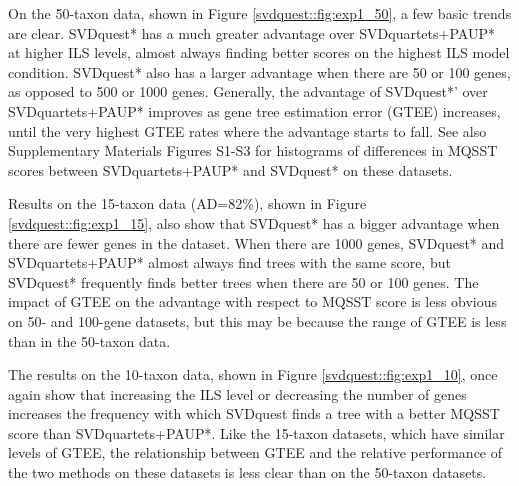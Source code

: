 On the 50-taxon data, shown in Figure \ref{svdquest::fig:exp1_50}, a few basic
trends are clear. 
SVDquest* has a much greater advantage over SVDquartets+PAUP* at
higher ILS levels, almost always finding better scores on the highest
ILS model condition. SVDquest* also has a larger advantage when there
are 50 or 100 genes, as opposed to 500 or 1000 genes. 
Generally, the advantage of 
SVDquest*' over SVDquartets+PAUP* improves as gene tree estimation error (GTEE)
increases, until the very highest GTEE rates where
the advantage starts to fall. 
See also {Supplementary Materials Figures S1-S3} for  histograms of differences in MQSST scores between SVDquartets+PAUP* and SVDquest* on these datasets.

Results on the 15-taxon data (AD=82\%), shown in Figure \ref{svdquest::fig:exp1_15}, also show
that SVDquest* has a bigger advantage when there are fewer genes in
the dataset. When there are 1000 genes, SVDquest* and SVDquartets+PAUP* almost
always find trees with the same score, but SVDquest* frequently finds
better trees when there are 50 or 100 genes. 
The impact of GTEE on the advantage with respect to MQSST score is less obvious on 50- and 100-gene datasets, but this
may be because 
the range of GTEE is less than in the 50-taxon data.

The results on the 10-taxon data, shown in Figure \ref{svdquest::fig:exp1_10},
once again show that increasing the ILS level or decreasing
the number of genes increases the 
frequency with which SVDquest finds a tree with a better MQSST
score than SVDquartets+PAUP*.
 Like the 15-taxon datasets, which have
similar levels of GTEE,  the relationship
between GTEE and the relative performance of the two methods on these
datasets is less clear than on the 50-taxon datasets.



